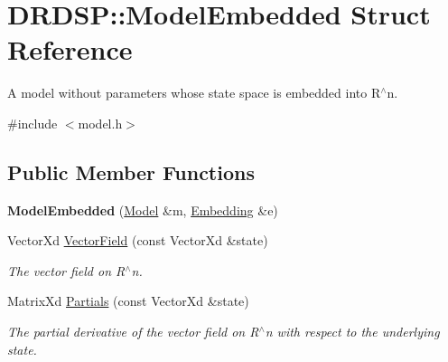 \hypertarget{struct_d_r_d_s_p_1_1_model_embedded}{\section{D\-R\-D\-S\-P\-:\-:Model\-Embedded Struct Reference}
\label{struct_d_r_d_s_p_1_1_model_embedded}
}


A model without parameters whose state space is embedded into R$^\wedge$n.  




{\ttfamily \#include $<$model.\-h$>$}

\subsection*{Public Member Functions}
\begin{DoxyCompactItemize}
\item 
\hypertarget{struct_d_r_d_s_p_1_1_model_embedded_aac8110fc1d52b006311cc1ca9377a8d4}{{\bfseries Model\-Embedded} (\hyperlink{struct_d_r_d_s_p_1_1_model}{Model} \&m, \hyperlink{struct_d_r_d_s_p_1_1_embedding}{Embedding} \&e)}\label{struct_d_r_d_s_p_1_1_model_embedded_aac8110fc1d52b006311cc1ca9377a8d4}

\item 
\hypertarget{struct_d_r_d_s_p_1_1_model_embedded_a4f33e3c6473e997ae92c75771aa918fd}{Vector\-Xd \hyperlink{struct_d_r_d_s_p_1_1_model_embedded_a4f33e3c6473e997ae92c75771aa918fd}{Vector\-Field} (const Vector\-Xd \&state)}\label{struct_d_r_d_s_p_1_1_model_embedded_a4f33e3c6473e997ae92c75771aa918fd}

\begin{DoxyCompactList}\small\item\em The vector field on R$^\wedge$n. \end{DoxyCompactList}\item 
\hypertarget{struct_d_r_d_s_p_1_1_model_embedded_a6aaa71ce7c8a2b11f86e7950498249c0}{Matrix\-Xd \hyperlink{struct_d_r_d_s_p_1_1_model_embedded_a6aaa71ce7c8a2b11f86e7950498249c0}{Partials} (const Vector\-Xd \&state)}\label{struct_d_r_d_s_p_1_1_model_embedded_a6aaa71ce7c8a2b11f86e7950498249c0}

\begin{DoxyCompactList}\small\item\em The partial derivative of the vector field on R$^\wedge$n with respect to the underlying state. \end{DoxyCompactList}\end{DoxyCompactItemize}
